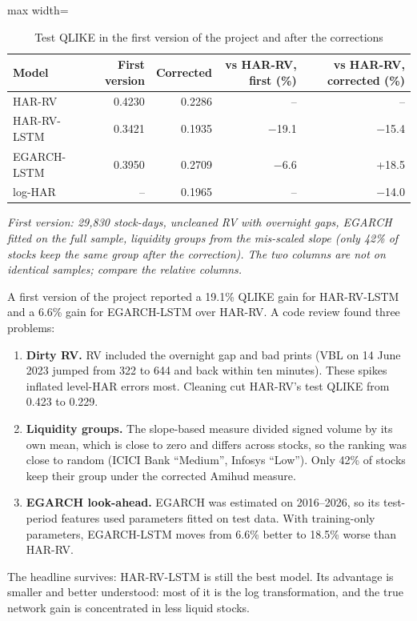 \documentclass[11pt,a4paper]{article}
\begin{document}
\begin{table}[htbp]
\centering
\caption{Test QLIKE in the first version of the project and after the corrections}
\label{tab:versions}
\small
\begin{adjustbox}{max width=\textwidth}
\begin{tabular}{lrrrr}
\toprule
Model & First version & Corrected & vs HAR-RV, first (\%) & vs HAR-RV, corrected (\%) \\
\midrule
HAR-RV & 0.4230 & 0.2286 & -- & -- \\
HAR-RV-LSTM & 0.3421 & 0.1935 & $-$19.1 & $-$15.4 \\
EGARCH-LSTM & 0.3950 & 0.2709 & $-$6.6 & +18.5 \\
log-HAR & -- & 0.1965 & -- & $-$14.0 \\
\bottomrule
\end{tabular}
\end{adjustbox}
\par\smallskip\parbox{0.95\textwidth}{\footnotesize\itshape First version: 29,830 stock-days, uncleaned RV with overnight gaps, EGARCH fitted on the full sample, liquidity groups from the mis-scaled slope (only 42\% of stocks keep the same group after the correction). The two columns are not on identical samples; compare the relative columns.}
\end{table}


A first version of the project reported a 19.1\% QLIKE gain for HAR-RV-LSTM and a 6.6\% gain for
EGARCH-LSTM over HAR-RV. A code review found three problems:
\begin{enumerate}
\item \textbf{Dirty RV.} RV included the overnight gap and bad prints (VBL on 14 June 2023 jumped from 322
to 644 and back within ten minutes). These spikes inflated level-HAR errors most. Cleaning cut HAR-RV's
test QLIKE from 0.423 to 0.229.
\item \textbf{Liquidity groups.} The slope-based measure divided signed volume by its own mean, which is
close to zero and differs across stocks, so the ranking was close to random (ICICI Bank ``Medium'',
Infosys ``Low''). Only 42\% of stocks keep their group under the corrected Amihud measure.
\item \textbf{EGARCH look-ahead.} EGARCH was estimated on 2016--2026, so its test-period features used
parameters fitted on test data. With training-only parameters, EGARCH-LSTM moves from 6.6\% better to
18.5\% worse than HAR-RV.
\end{enumerate}
The headline survives: HAR-RV-LSTM is still the best model. Its advantage is smaller and better
understood: most of it is the log transformation, and the true network gain is concentrated in less
liquid stocks.
\end{document}
